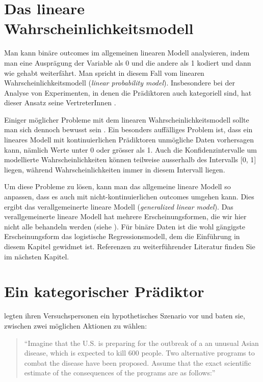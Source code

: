 \documentclass[oneside, 10pt]{book}\usepackage[]{graphicx}\usepackage[]{xcolor}
\begin{document}
\section{Das lineare Wahrscheinlichkeitsmodell}
Man kann binäre outcomes im allgemeinen linearen Modell
analysieren, indem man eine Ausprägung der Variable als 0 und die andere
als 1 kodiert und dann wie gehabt weiterfährt. Man spricht in diesem
Fall vom linearen Wahrscheinlichkeitsmodell (\textit{linear probability model}).
Insbesondere bei der Analyse von Experimenten, in denen die Prädiktoren
auch kategoriell sind, hat dieser Ansatz seine VertreterInnen 
\citep[z.B.~][]{Hellevik2009,Huang2019}.

Einiger möglicher Probleme mit dem linearen Wahrscheinlichkeitsmodell
sollte man sich dennoch bewusst sein \citep[siehe][]{Jaeger2008}.
Ein besonders auffälliges Problem ist, dass
ein lineares Modell mit kontinuierlichen Prädiktoren
unmögliche Daten vorhersagen kann, nämlich
Werte unter 0 oder grösser als 1. Auch die Konfidenzintervalle
um modellierte Wahrscheinlichkeiten können teilweise ausserhalb
des Intervalls [0, 1] liegen, während Wahrscheinlichkeiten immer
in diesem Intervall liegen.

Um diese Probleme zu lösen, kann man das
allgemeine lineare Modell so anpassen, dass es auch
mit nicht-kontinuierlichen outcomes umgehen kann.
Dies ergibt das verallgemeinerte lineare Modell
(\textit{generalized linear model}).
Das verallgemeinerte lineare Modell
hat mehrere Erscheinungsformen, die wir hier nicht alle behandeln
werden (siehe \citealp{Faraway2006}). Für binäre Daten ist
die wohl gängigste Erscheinungsform das logistische Regressionsmodell,
dem die Einführung in diesem Kapitel gewidmet ist.
Referenzen zu weiterführender Literatur finden Sie im nächsten
Kapitel.

\section{Ein kategorischer Prädiktor}
\citet{Tversky1981} legten ihren Versuchspersonen
ein hypothetisches Szenario vor und baten sie,
zwischen zwei möglichen Aktionen zu wählen:
\begin{quote}
 ``Imagine that the U.S. is preparing for the outbreak of a
 an unusual Asian disease, which is expected to kill 600 people.
 Two alternative programs to combat the disease have been proposed.
 Assume that the exact scientific estimate of the consequences
 of the programs are as follows:''
\end{quote}
\end{document}
